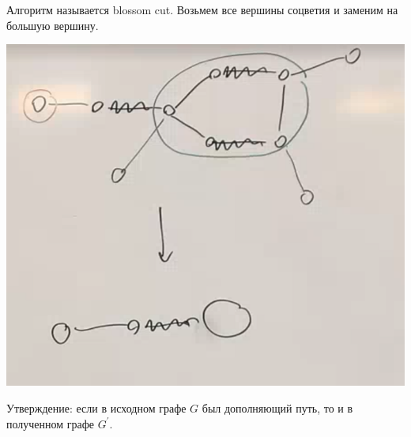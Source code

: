 Алгоритм называется blossom cut.
Возьмем все вершины соцветия и заменим на большую вершину.
\begin{center}
    \includegraphics[scale=0.5]{img/parsoch_blossom_cut}
\end{center}

Утверждение: если в исходном графе $G$ был дополняющий путь, то и в полученном графе $G^\prime$.

